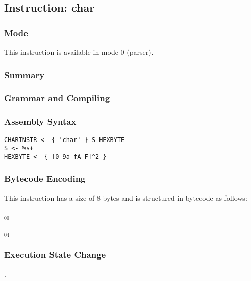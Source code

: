 \subsection{Instruction: char}

\subsubsection{Mode}
This instruction is available in mode 0 (parser).
\subsubsection{Summary}


\subsubsection{Grammar and Compiling}


\subsubsection{Assembly Syntax}

\begin{myquote}
\begin{verbatim}
CHARINSTR <- { 'char' } S HEXBYTE
S <- %s+
HEXBYTE <- { [0-9a-fA-F]^2 }
\end{verbatim}
\end{myquote}

\subsubsection{Bytecode Encoding}

This instruction has a size of 8 bytes and is structured in bytecode as follows:

$_{00}$\ 



$_{04}$\ 

\subsubsection{Execution State Change}

.


